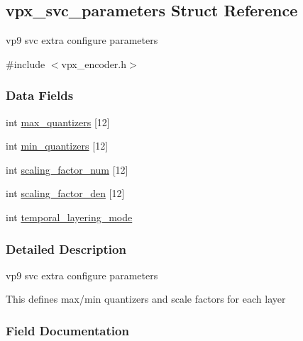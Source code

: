 \hypertarget{structvpx__svc__parameters}{}\subsection{vpx\+\_\+svc\+\_\+parameters Struct Reference}
\label{structvpx__svc__parameters}


vp9 svc extra configure parameters  




{\ttfamily \#include $<$vpx\+\_\+encoder.\+h$>$}

\subsubsection*{Data Fields}
\begin{DoxyCompactItemize}
\item 
int \hyperlink{structvpx__svc__parameters_aae494f231727fd9f5feb47b465452509}{max\+\_\+quantizers} \mbox{[}12\mbox{]}
\item 
int \hyperlink{structvpx__svc__parameters_a4b32be6e2e6f0c808c4ed3044f3c7ddf}{min\+\_\+quantizers} \mbox{[}12\mbox{]}
\item 
int \hyperlink{structvpx__svc__parameters_a79544d65e1b3bb0b71f85b3f2b7167bf}{scaling\+\_\+factor\+\_\+num} \mbox{[}12\mbox{]}
\item 
int \hyperlink{structvpx__svc__parameters_aaf33b6a09e97e04763b6d10de3899ee4}{scaling\+\_\+factor\+\_\+den} \mbox{[}12\mbox{]}
\item 
int \hyperlink{structvpx__svc__parameters_adf8ca5b4011bf6c0d6248bafc4177190}{temporal\+\_\+layering\+\_\+mode}
\end{DoxyCompactItemize}


\subsubsection{Detailed Description}
vp9 svc extra configure parameters 

This defines max/min quantizers and scale factors for each layer 

\subsubsection{Field Documentation}
